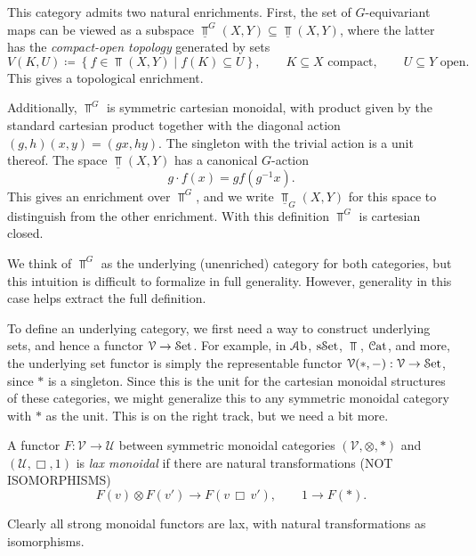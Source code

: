 This category admits two natural enrichments. First, the set of $G$-equivariant maps can be viewed as a subspace $\underline{\Top }^G(X,Y)\subseteq \underline{\Top }(X,Y)$, where the latter has the \emph{compact-open topology} generated by sets
\[
	V(K,U)\coloneqq \left\{ f\in \Top (X,Y) \mid f(K)\subseteq U \right\} ,\qquad K\subseteq X\text{ compact} ,\qquad U\subseteq Y\text{ open} 
.\]
This gives a topological enrichment.

Additionally, $\Top ^G$ is symmetric cartesian monoidal, with product given by the standard cartesian product together with the diagonal action $(g,h)(x,y)=(gx,hy)$. The singleton with the trivial action is a unit thereof. The space $\underline{\Top }(X,Y)$ has a canonical $G$-action
\[
	g\cdot f(x)=gf(g^{-1} x)
.\]
This gives an enrichment over $\Top ^G$, and we write $\underline{\Top }_G(X,Y)$ for this space to distinguish from the other enrichment. With this definition $\Top ^G$ is cartesian closed.

We think of $\Top ^G$ as the underlying (unenriched) category for both categories, but this intuition is difficult to formalize in full generality. However, generality in this case helps extract the full definition.

To define an underlying category, we first need a way to construct underlying sets, and hence a functor $\mathcal{V}\to \mathcal{S}\mathrm{et} $. For example, in $\mathcal{A}\mathrm{b}$, $\mathrm{s}\mathcal{S}\mathrm{et}$, $\Top $, $\mathcal{C}\mathrm{at} $, and more, the underlying set functor is simply the representable functor $\mathcal{V} (*,-): \mathcal{V}  \to \mathcal{S}\mathrm{et} $, since $*$ is a singleton. Since this is the unit for the cartesian monoidal structures of these categories, we might generalize this to any symmetric monoidal category with $*$ as the unit. This is on the right track, but we need a bit more.
\begin{definition}\label{dfn:3.3}
	A functor $F : \mathcal{V}  \to \mathcal{U} $ between symmetric monoidal categories $(\mathcal{V} ,\otimes ,*)$ and $(\mathcal{U} , \Box,1)$ is \emph{lax monoidal} if there are natural transformations (NOT ISOMORPHISMS)
	\[
		F(v)\otimes F(v')\to F(v\,\Box \,v'),\qquad 1\to F(*)
	.\]
\end{definition}
Clearly all strong monoidal functors are lax, with natural transformations as isomorphisms. 

